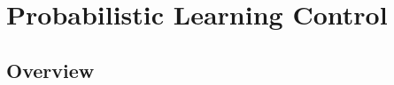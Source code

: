 \chapter{P\lowercase{robabilistic} L\lowercase{earning} C\lowercase{ontrol}}


\section{Overview} \label{sec:learnover}
